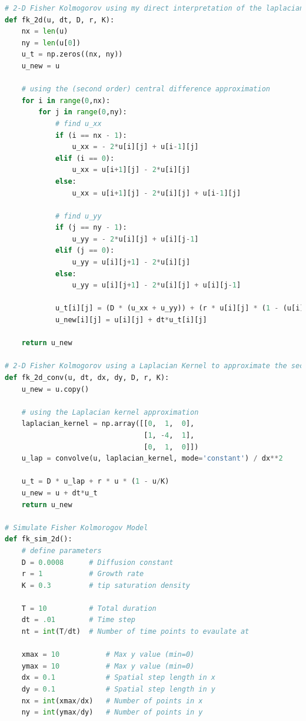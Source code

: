 \documentclass{article}
\begin{document}
\hypertarget{FK_2D_Code}{}
\begin{lstlisting}[language=Python, caption=2D Fisher Kolmogorov Code]
# 2-D Fisher Kolmogorov using my direct interpretation of the laplacian formula
def fk_2d(u, dt, D, r, K):
    nx = len(u)
    ny = len(u[0])
    u_t = np.zeros((nx, ny))
    u_new = u

    # using the (second order) central difference approximation
    for i in range(0,nx):
        for j in range(0,ny):
            # find u_xx 
            if (i == nx - 1):
                u_xx = - 2*u[i][j] + u[i-1][j]
            elif (i == 0):
                u_xx = u[i+1][j] - 2*u[i][j]
            else:
                u_xx = u[i+1][j] - 2*u[i][j] + u[i-1][j]

            # find u_yy
            if (j == ny - 1):
                u_yy = - 2*u[i][j] + u[i][j-1]
            elif (j == 0):
                u_yy = u[i][j+1] - 2*u[i][j]
            else:
                u_yy = u[i][j+1] - 2*u[i][j] + u[i][j-1]

            u_t[i][j] = (D * (u_xx + u_yy)) + (r * u[i][j] * (1 - (u[i][j]/K)))
            u_new[i][j] = u[i][j] + dt*u_t[i][j]
    
    return u_new

# 2-D Fisher Kolmogorov using a Laplacian Kernel to approximate the second derivative
def fk_2d_conv(u, dt, dx, dy, D, r, K):
    u_new = u.copy()

    # using the Laplacian kernel approximation
    laplacian_kernel = np.array([[0,  1,  0],
                                 [1, -4,  1],
                                 [0,  1,  0]])
    u_lap = convolve(u, laplacian_kernel, mode='constant') / dx**2
    
    u_t = D * u_lap + r * u * (1 - u/K)
    u_new = u + dt*u_t
    return u_new

# Simulate Fisher Kolmorogov Model
def fk_sim_2d():
    # define parameters
    D = 0.0008      # Diffusion constant
    r = 1           # Growth rate
    K = 0.3         # tip saturation density
    
    T = 10          # Total duration
    dt = .01        # Time step
    nt = int(T/dt)  # Number of time points to evaulate at
    
    xmax = 10           # Max y value (min=0)
    ymax = 10           # Max y value (min=0)
    dx = 0.1            # Spatial step length in x
    dy = 0.1            # Spatial step length in y
    nx = int(xmax/dx)   # Number of points in x
    ny = int(ymax/dy)   # Number of points in y


\end{lstlisting}
\end{document}
